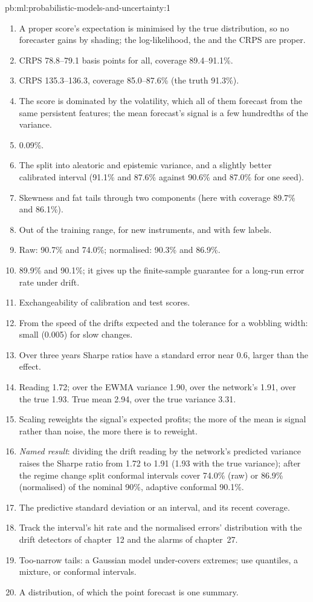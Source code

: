 \begin{solution}{pb:ml:probabilistic-models-and-uncertainty:1}
\begin{enumerate}
\item A proper score's expectation is minimised by the true distribution, so no forecaster gains by shading; the
log-likelihood, the  and the CRPS are proper.
\item CRPS 78.8--79.1 basis points for all, coverage 89.4--91.1\%.
\item CRPS 135.3--136.3, coverage 85.0--87.6\% (the truth 91.3\%).
\item The score is dominated by the volatility, which all of them forecast from the same persistent features; the mean
forecast's signal is a few hundredths of the variance.
\item 0.09\%.
\item The split into aleatoric and epistemic variance, and a slightly better calibrated interval (91.1\% and 87.6\% against
90.6\% and 87.0\% for one seed).
\item Skewness and fat tails through two components (here with coverage 89.7\% and 86.1\%).
\item Out of the training range, for new instruments, and with few labels.
\item Raw: 90.7\% and 74.0\%; normalised: 90.3\% and 86.9\%.
\item 89.9\% and 90.1\%; it gives up the finite-sample guarantee for a long-run error rate under drift.
\item Exchangeability of calibration and test scores.
\item From the speed of the drifts expected and the tolerance for a wobbling width: small (0.005) for slow changes.
\item Over three years Sharpe ratios have a standard error near 0.6, larger than the effect.
\item Reading 1.72; over the EWMA variance 1.90, over the network's 1.91, over the true 1.93. True mean 2.94, over the true
variance 3.31.
\item Scaling reweights the signal's expected profits; the more of the mean is signal rather than noise, the more there is
to reweight.
\item \emph{Named result}: dividing the drift reading by the network's predicted variance raises the Sharpe ratio from 1.72
to 1.91 (1.93 with the true variance); after the regime change split conformal intervals cover 74.0\% (raw) or 86.9\%
(normalised) of the nominal 90\%, adaptive conformal 90.1\%.
\item The predictive standard deviation or an interval, and its recent coverage.
\item Track the interval's hit rate and the normalised errors' distribution with the drift detectors of chapter~12 and the
alarms of chapter~27.
\item Too-narrow tails: a Gaussian model under-covers extremes; use quantiles, a mixture, or conformal intervals.
\item A distribution, of which the point forecast is one summary.
\end{enumerate}
\end{solution}
